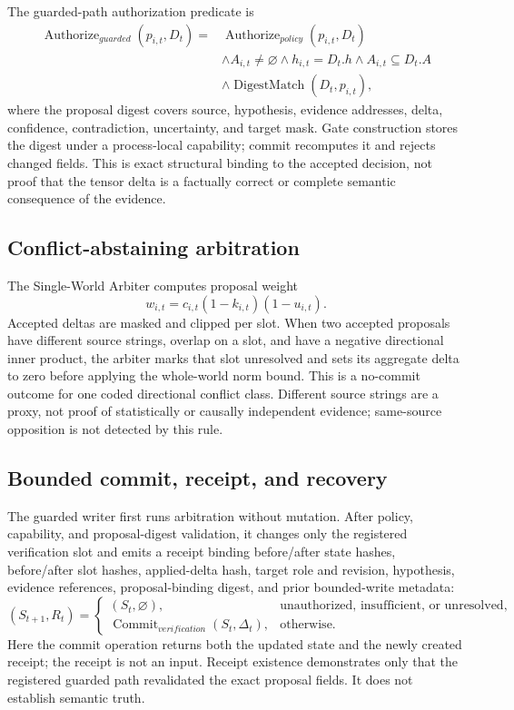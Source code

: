 \documentclass[10pt]{article}
\begin{document}
The guarded-path authorization predicate is
\begin{align}
\operatorname{Authorize}_{guarded}(p_{i,t},D_t)={}&\operatorname{Authorize}_{policy}(p_{i,t},D_t)\\
&\land A_{i,t}\neq\varnothing
\land h_{i,t}=D_t.h
\land A_{i,t}\subseteq D_t.A\\
&\land \operatorname{DigestMatch}(D_t,p_{i,t}),
\end{align}
where the proposal digest covers source, hypothesis, evidence addresses, delta, confidence, contradiction, uncertainty, and target mask. Gate construction stores the digest under a process-local capability; commit recomputes it and rejects changed fields. This is exact structural binding to the accepted decision, not proof that the tensor delta is a factually correct or complete semantic consequence of the evidence.

\subsection{Conflict-abstaining arbitration}

The Single-World Arbiter computes proposal weight
\begin{equation}
  w_{i,t}=c_{i,t}(1-k_{i,t})(1-u_{i,t}).
\end{equation}
Accepted deltas are masked and clipped per slot. When two accepted proposals have different source strings, overlap on a slot, and have a negative directional inner product, the arbiter marks that slot unresolved and sets its aggregate delta to zero before applying the whole-world norm bound. This is a no-commit outcome for one coded directional conflict class. Different source strings are a proxy, not proof of statistically or causally independent evidence; same-source opposition is not detected by this rule.

\subsection{Bounded commit, receipt, and recovery}

The guarded writer first runs arbitration without mutation. After policy, capability, and proposal-digest validation, it changes only the registered verification slot and emits a receipt binding before/after state hashes, before/after slot hashes, applied-delta hash, target role and revision, hypothesis, evidence references, proposal-binding digest, and prior bounded-write metadata:
\begin{equation}
(S_{t+1},R_t)=\begin{cases}
(S_t,\varnothing),&\text{unauthorized, insufficient, or unresolved},\\
\operatorname{Commit}_{verification}(S_t,\Delta_t),&\text{otherwise.}
\end{cases}
\end{equation}
Here the commit operation returns both the updated state and the newly created receipt; the receipt is not an input. Receipt existence demonstrates only that the registered guarded path revalidated the exact proposal fields. It does not establish semantic truth.
\end{document}
